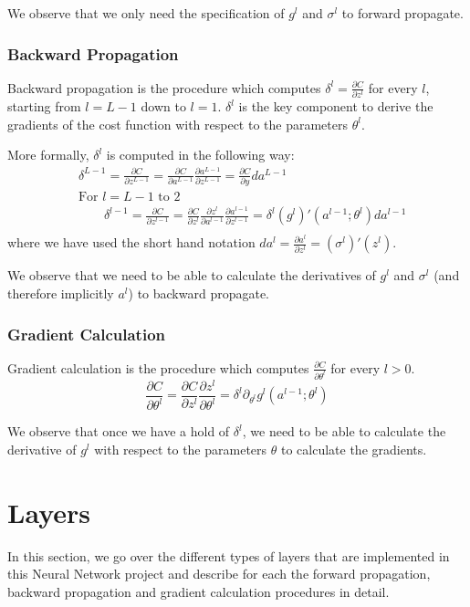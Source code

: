 \documentclass{article} %
\begin{document}
We observe that we only need the specification of $g^l$ and $\sigma^l$ to forward propagate.

\subsubsection{Backward Propagation}
Backward propagation is the procedure which computes $\delta^l=\frac{\partial C}{\partial z^l}$ for every $l$, starting from $l=L-1$ down to $l=1$. $\delta^l$ is the key component to derive the gradients of the cost function with respect to the parameters $\theta^l$.

More formally, $\delta^l$ is computed in the following way:
$$
\begin{aligned}
&\delta^{L-1} = \frac{\partial C}{\partial z^{L-1}} 
= \frac{\partial C}{\partial a^{L-1}}\frac{\partial a^{L-1}}{\partial z^{L-1}}
= \frac{\partial C}{\partial y}da^{L-1}\\
&\text{For }l=L-1\text{ to }2\\
&\qquad\delta^{l-1}=\frac{\partial C}{\partial z^{l-1}}
=\frac{\partial C}{\partial z^l}\frac{\partial z^l}{\partial a^{l-1}}\frac{\partial a^{l-1}}{\partial z^{l-1}}
= \delta^l (g^l)'(a^{l-1};\theta^l)da^{l-1}\\
\end{aligned}
$$
where we have used the short hand notation $da^l = \frac{\partial a^l}{\partial z^l} = (\sigma^l)' (z^l)$.

We observe that we need to be able to calculate the derivatives of $g^l$ and $\sigma^{l}$ (and therefore implicitly $a^l$) to backward propagate.

\subsubsection{Gradient Calculation}
Gradient calculation is the procedure which computes $\frac{\partial C}{\partial \theta^l}$ for every $l>0$.
$$
\frac{\partial C}{\partial \theta^l} = \frac{\partial C}{\partial z^l}\frac{\partial z^l}{\partial \theta^l} = \delta^l \partial_{\theta^l} g^l(a^{l-1};\theta^l)
$$

We observe that once we have a hold of $\delta^l$, we need to be able to calculate the derivative of $g^l$ with respect to the parameters $\theta$ to calculate the gradients.

\newpage
\section{Layers}
In this section, we go over the different types of layers that are implemented in this Neural Network project and describe for each the forward propagation, backward propagation and gradient calculation procedures in detail.
\end{document}
